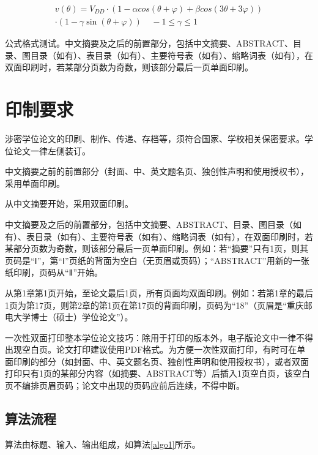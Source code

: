\begin{equation}
\begin{aligned}
v(\theta ) = V_{DD}\cdot(1 - \alpha cos(\theta  + \varphi ) + \beta cos(3\theta  + 3\varphi ))\\
\cdot(1 - \gamma \sin (\theta  + \varphi )) ~~~~~- 1 \le \gamma  \le 1\
\end{aligned}
\label{eq:vd}
\end{equation}




\noindent
公式格式测试。中文摘要及之后的前置部分，包括中文摘要、ABSTRACT、目录、图目录（如有）、表目录（如有）、主要符号表（如有）、缩略词表（如有），在双面印刷时，若某部分页数为奇数，则该部分最后一页单面印刷。

\section{印制要求}
涉密学位论文的印刷、制作、传递、存档等，须符合国家、学校相关保密要求。学位论文一律左侧装订。

中文摘要之前的前置部分（封面、中、英文题名页、独创性声明和使用授权书），采用单面印刷。

从中文摘要开始，采用双面印刷。

中文摘要及之后的前置部分，包括中文摘要、ABSTRACT、目录、图目录（如有）、表目录（如有）、主要符号表（如有）、缩略词表（如有），在双面印刷时，若某部分页数为奇数，则该部分最后一页单面印刷。例如：若“摘要”只有1页，则其页码是“Ⅰ”，第“Ⅰ”页纸的背面为空白（无页眉或页码）；“ABSTRACT”用新的一张纸印刷，页码从“Ⅱ”开始。

从第1章第1页开始，至论文最后1页，所有页面均双面印刷。例如：若第1章的最后1页为第17页，则第2章的第1页在第17页的背面印刷，页码为“18”（页眉是“重庆邮电大学博士（硕士）学位论文”）。

一次性双面打印整本学位论文技巧：除用于打印的版本外，电子版论文中一律不得出现空白页。论文打印建议使用PDF格式。为方便一次性双面打印，有时可在单面印刷的部分（如封面、中、英文题名页、独创性声明和使用授权书），或者双面打印只有1页的某部分内容（如摘要、ABSTRACT等）后插入1页空白页，该空白页不编排页眉页码；论文中出现的页码应前后连续，不得中断。

\subsection{算法流程}
	算法由标题、输入、输出组成，如算法\ref{algo1}所示。

